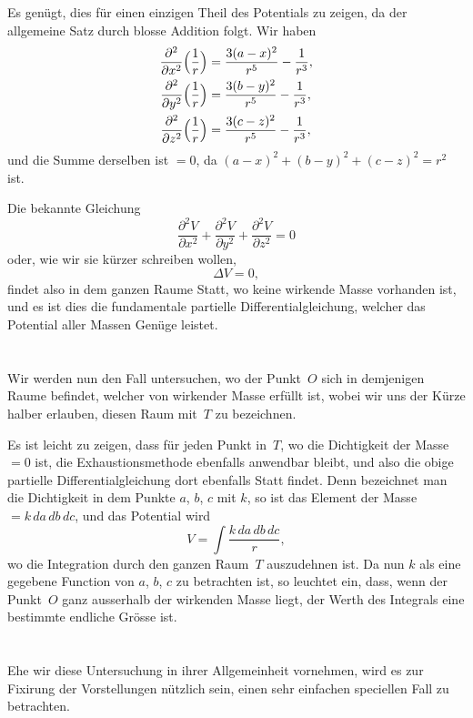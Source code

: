 \documentclass[12pt,a4paper]{article}
\begin{document}
Es genügt, dies für einen einzigen Theil des Potentials zu zeigen, da der
allgemeine Satz durch blosse Addition folgt. Wir haben
\begin{align*}
\frac{\partial^2}{\partial x^2}\Bigl(\frac{1}{r}\Bigr) &= \frac{3(a-x)^2}{r^5}-\frac{1}{r^3},\\
\frac{\partial^2}{\partial y^2}\Bigl(\frac{1}{r}\Bigr) &= \frac{3(b-y)^2}{r^5}-\frac{1}{r^3},\\
\frac{\partial^2}{\partial z^2}\Bigl(\frac{1}{r}\Bigr) &= \frac{3(c-z)^2}{r^5}-\frac{1}{r^3},
\end{align*}
und die Summe derselben ist $=0$, da $(a-x)^2+(b-y)^2+(c-z)^2=r^2$ ist.

Die bekannte Gleichung
\[
\frac{\partial^2 V}{\partial x^2}+\frac{\partial^2 V}{\partial y^2}+\frac{\partial^2 V}{\partial z^2}=0
\]
oder, wie wir sie kürzer schreiben wollen,
\[
\Delta V = 0,
\]
findet also in dem ganzen Raume Statt, wo keine wirkende Masse vorhanden
ist, und es ist dies die fundamentale partielle Differentialgleichung, welcher das
Potential aller Massen Genüge leistet.

\section{}
Wir werden nun den Fall untersuchen, wo der Punkt~$O$ sich in demjenigen
Raume befindet, welcher von wirkender Masse erfüllt ist, wobei wir uns der
Kürze halber erlauben, diesen Raum mit~$T$ zu bezeichnen.

Es ist leicht zu zeigen, dass für jeden Punkt in~$T$, wo die Dichtigkeit der
Masse $=0$ ist, die Exhaustionsmethode ebenfalls anwendbar bleibt, und also die
obige partielle Differentialgleichung dort ebenfalls Statt findet. Denn bezeichnet
man die Dichtigkeit in dem Punkte $a$, $b$, $c$ mit $k$, so ist das Element der Masse
$=k\,da\,db\,dc$, und das Potential wird
\[
V = \int\frac{k\,da\,db\,dc}{r},
\]
wo die Integration durch den ganzen Raum~$T$ auszudehnen ist. Da nun $k$
als eine gegebene Function von $a$, $b$, $c$ zu betrachten ist, so leuchtet ein, dass,
wenn der Punkt~$O$ ganz ausserhalb der wirkenden Masse liegt, der Werth des
Integrals eine bestimmte endliche Grösse ist.

\section{}
Ehe wir diese Untersuchung in ihrer Allgemeinheit vornehmen, wird es
zur Fixirung der Vorstellungen nützlich sein, einen sehr einfachen speciellen
Fall zu betrachten.
\end{document}
